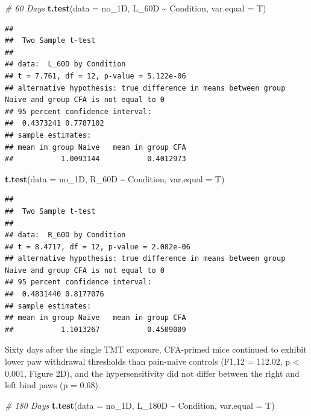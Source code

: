 \documentclass[
]{book}
\newenvironment{Shaded}{\begin{snugshade}}{\end{snugshade}}
\newcommand{\AttributeTok}[1]{\textcolor[rgb]{0.13,0.29,0.53}{#1}}
\newcommand{\CommentTok}[1]{\textcolor[rgb]{0.56,0.35,0.01}{\textit{#1}}}
\newcommand{\FunctionTok}[1]{\textcolor[rgb]{0.13,0.29,0.53}{\textbf{#1}}}
\newcommand{\NormalTok}[1]{#1}
\newcommand{\SpecialCharTok}[1]{\textcolor[rgb]{0.81,0.36,0.00}{\textbf{#1}}}
\begin{document}
\begin{Shaded}
\begin{Highlighting}[]
\CommentTok{\# 60 Days}
\FunctionTok{t.test}\NormalTok{(}\AttributeTok{data =}\NormalTok{ no\_1D,  L\_60D }\SpecialCharTok{\textasciitilde{}}\NormalTok{ Condition, }\AttributeTok{var.equal =}\NormalTok{ T)}
\end{Highlighting}
\end{Shaded}

\begin{verbatim}
## 
##  Two Sample t-test
## 
## data:  L_60D by Condition
## t = 7.761, df = 12, p-value = 5.122e-06
## alternative hypothesis: true difference in means between group Naive and group CFA is not equal to 0
## 95 percent confidence interval:
##  0.4373241 0.7787102
## sample estimates:
## mean in group Naive   mean in group CFA 
##           1.0093144           0.4012973
\end{verbatim}

\begin{Shaded}
\begin{Highlighting}[]
\FunctionTok{t.test}\NormalTok{(}\AttributeTok{data =}\NormalTok{ no\_1D, R\_60D }\SpecialCharTok{\textasciitilde{}}\NormalTok{ Condition, }\AttributeTok{var.equal =}\NormalTok{ T)}
\end{Highlighting}
\end{Shaded}

\begin{verbatim}
## 
##  Two Sample t-test
## 
## data:  R_60D by Condition
## t = 8.4717, df = 12, p-value = 2.082e-06
## alternative hypothesis: true difference in means between group Naive and group CFA is not equal to 0
## 95 percent confidence interval:
##  0.4831440 0.8177076
## sample estimates:
## mean in group Naive   mean in group CFA 
##           1.1013267           0.4509009
\end{verbatim}

Sixty days after the single TMT exposure, CFA-primed mice continued to exhibit lower paw withdrawal thresholds than pain-naive controls (F1,12 = 112.02, p \textless{} 0.001, Figure 2D), and the hypersensitivity did not differ between the right and left hind paws (p = 0.68).

\begin{Shaded}
\begin{Highlighting}[]
\CommentTok{\# 180 Days}
\FunctionTok{t.test}\NormalTok{(}\AttributeTok{data =}\NormalTok{ no\_1D, L\_180D }\SpecialCharTok{\textasciitilde{}}\NormalTok{ Condition, }\AttributeTok{var.equal =}\NormalTok{ T)}
\end{Highlighting}
\end{Shaded}
\end{document}
